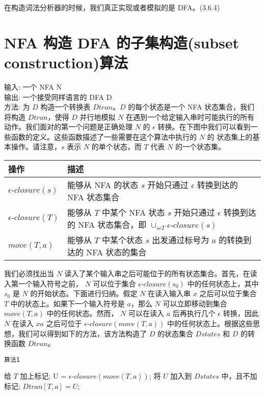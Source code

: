 在构造词法分析器的时候，我们真正实现或者模拟的是 DFA。(3.6.4)


\section*{NFA 构造 DFA 的子集构造(subset construction)算法}

输入: 一个 NFA N  \\
输出: 一个接受同样语言的 DFA D  \\
方法: 为 $D$ 构造一个转换表 $Dtran$。$D$ 的每个状态是一个 NFA 状态集合，我们将构造 $Dtran$，使得 $D$ 并行地模拟 $N$ 在遇到一个给定输入串时可能执行的所有动作。我们面对的第一个问题是正确处理 $N$ 的 $\epsilon$ 转换。在下图中我们可以看到一些函数的定义。这些函数描述了一些需要在这个算法中执行的 $N$ 的 状态集上的基本操作。请注意，$s$ 表示 $N$ 的单个状态，而 $T$ 代表 $N$ 的一个状态集。

\begin{tabular}{lp{10cm}}
\toprule
操作 & 描述 \\
\midrule
$\epsilon \mbox{-} closure(s)$ & 能够从 NFA 的状态 $s$ 开始只通过 $\epsilon$ 转换到达的 NFA 状态集合 \\
$\epsilon \mbox{-} closure(T)$ & 能够从 $T$ 中某个 NFA 状态 $s$ 开始只通过 $\epsilon$ 转换到达的 NFA 状态集合，即 $\cup_{s \epsilon T} \epsilon\mbox{-}closure(s)$ \\
$move(T, a)$ & 能够从 $T$ 中某个状态 $s$ 出发通过标号为 $a$ 的转换到达的 NFA 状态的集合 \\
\bottomrule
\end{tabular}



我们必须找出当 $N$ 读入了某个输入串之后可能位于的所有状态集合。首先，在读入第一个输入符号之前， $N$ 可以位于集合 $\epsilon \mbox{-} closure(s_{0})$ 中的任何状态上，其中 $s_{0}$ 是 $N$ 的开始状态。下面进行归纳。假定 $N$ 在读入输入串 $x$ 之后可以位于集合 $T$ 中的状态上。如果下一个输入符号是 $a$，那么 $N$ 可以立即移动到集合 $move(T, a)$ 中的任何状态。然而， $N$ 可以在读入 $a$ 后再执行几个 $\epsilon$ 转换，因此 $N$ 在读入 $xa$ 之后可位于 $\epsilon \mbox{-} closure(move(T, a))$ 中的任何状态上。根据这些思想，我们可以得到如下的方法，该方法构造了 $D$ 的状态集合 $Dstates$ 和 $D$ 的转换函数 $Dtran$。

\begin{algorithm}[H]
    \renewcommand{\thealgocf}{}
    \caption{\texttt{算法1}}
  {给 $T$ 加上标记;
   {
    U = $\epsilon \mbox{-} closure(move(T, a))$; 
	  {将 $U$ 加入到 $Dstates$ 中，且不加标记;}
	$Dtran[T, a] = U$;
  }
}
\end{algorithm}

